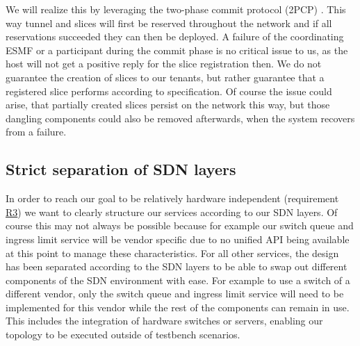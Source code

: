 We will realize this by leveraging the two-phase commit protocol (2PCP) \cite{2pcp}. This way tunnel and slices will first be reserved throughout the network and if all reservations succeeded they can then be deployed. A failure of the coordinating ESMF or a participant during the commit phase is no critical issue to us, as the host will not get a positive reply for the slice registration then. We do not guarantee the creation of slices to our tenants, but rather guarantee that a registered slice performs according to specification. Of course the issue could arise, that partially created slices persist on the network this way, but those dangling components could also be removed afterwards, when the system recovers from a failure.

\subsection{Strict separation of SDN layers}
In order to reach our goal to be relatively hardware independent (requirement \hyperref[R3]{R3}) we want to clearly structure our services according to our SDN layers. Of course this may not always be possible because for example our switch queue and ingress limit service will be vendor specific due to no unified API being available at this point to manage these characteristics. For all other services, the design has been separated according to the SDN layers to be able to swap out different components of the SDN environment with ease. For example to use a switch of a different vendor, only the switch queue and ingress limit service will need to be implemented for this vendor while the rest of the components can remain in use. This includes the integration of hardware switches or servers, enabling our topology to be executed outside of testbench scenarios.
